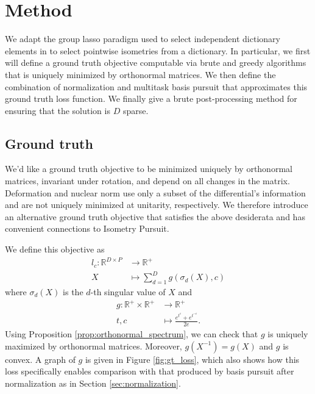 \section{Method}

We adapt the group lasso paradigm used to select independent dictionary elements in \citet{Koelle2022-ju, Koelle2024-no} to select pointwise isometries from a dictionary.
In particular, we first will define a ground truth objective computable via brute and greedy algorithms that is uniquely minimized by orthonormal matrices.
We then define the combination of normalization and multitask basis pursuit that approximates this ground truth loss function.
We finally give a brute post-processing method for ensuring that the solution is $D$ sparse.

\subsection{Ground truth}
\label{sec:ground_truth}

We'd like a ground truth objective to be minimized uniquely by orthonormal matrices, invariant under rotation, and depend on all changes in the matrix.
Deformation \citep{Kohli2021-lr} and nuclear norm \citep{Boyd2004-ql} use only a subset of the differential's information and are not uniquely minimized at unitarity, respectively.
We therefore introduce an alternative ground truth objective that satisfies the above desiderata and has convenient connections to Isometry Pursuit.

We define this objective as
\begin{align}
l_{c}: \mathbb R^{D \times P} &\to \mathbb R^{+} \\
X &\mapsto \sum_{d = 1}^D g(\sigma_d( X), c)
\end{align}
where $\sigma_d ( X)$ is the $d$-th singular value of $ X$ and
\begin{align}
g: \mathbb R^+ \times \mathbb R^+ &\to \mathbb R^+ \\
t,c &\mapsto \frac{e^{t^c} + e^{t^{-c}}}{2e}.
\end{align}
Using Proposition \ref{prop:orthonormal_spectrum}, we can check that $g$ is uniquely maximized by orthonormal matrices.
Moreover, $g( X^{-1}) = g( X)$ and $g$ is convex.
A graph of $g$ is given in Figure \ref{fig:gt_loss}, which also shows how this loss specifically enables comparison with that produced by basis pursuit after normalization as in Section \ref{sec:normalization}.

